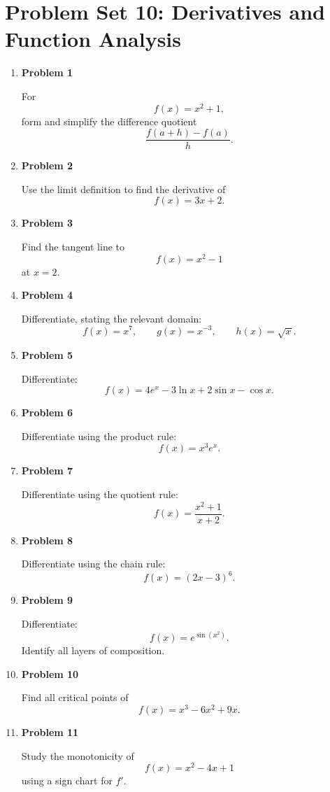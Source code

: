 \section{Problem Set 10: Derivatives and Function Analysis}

\begin{enumerate}
\item \textbf{Problem 1}\par
For
\[
f(x)=x^2+1,
\]
form and simplify the difference quotient
\[
\frac{f(a+h)-f(a)}{h}.
\]

\item \textbf{Problem 2}\par
Use the limit definition to find the derivative of
\[
f(x)=3x+2.
\]

\item \textbf{Problem 3}\par
Find the tangent line to
\[
f(x)=x^2-1
\]
at \(x=2\).

\item \textbf{Problem 4}\par
Differentiate, stating the relevant domain:
\[
f(x)=x^7,\qquad
g(x)=x^{-3},\qquad
h(x)=\sqrt{x}.
\]

\item \textbf{Problem 5}\par
Differentiate:
\[
f(x)=4e^x-3\ln x+2\sin x-\cos x.
\]

\item \textbf{Problem 6}\par
Differentiate using the product rule:
\[
f(x)=x^3e^x.
\]

\item \textbf{Problem 7}\par
Differentiate using the quotient rule:
\[
f(x)=\frac{x^2+1}{x+2}.
\]

\item \textbf{Problem 8}\par
Differentiate using the chain rule:
\[
f(x)=(2x-3)^6.
\]

\item \textbf{Problem 9}\par
Differentiate:
\[
f(x)=e^{\sin(x^2)}.
\]
Identify all layers of composition.

\item \textbf{Problem 10}\par
Find all critical points of
\[
f(x)=x^3-6x^2+9x.
\]

\item \textbf{Problem 11}\par
Study the monotonicity of
\[
f(x)=x^2-4x+1
\]
using a sign chart for \(f'\).


\end{enumerate}

